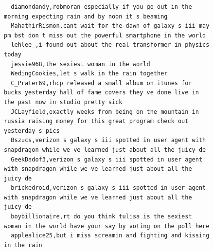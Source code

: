 \begin{figure}[htpb]
\begin{verbatim}
  diamondandy,robmoran especially if you go out in the morning expecting rain and by noon it s beaming
  MahathirRismon,cant wait for the dawn of galaxy s iii may pm bst don t miss out the powerful smartphone in the world
  lehlee_,i found out about the real transformer in physics today
  jessie968,the sexiest woman in the world
  WedingCookies,let s walk in the rain together
  C_Prater69,rhcp released a small album on itunes for bucks yesterday hall of fame covers they ve done live in the past now in studio pretty sick
  JCLayfield,exactly weeks from being on the mountain in russia raising money for this great program check out yesterday s pics
  Bszucs,verizon s galaxy s iii spotted in user agent with snapdragon while we ve learned just about all the juicy de
  GeekDadof3,verizon s galaxy s iii spotted in user agent with snapdragon while we ve learned just about all the juicy de
  brickedroid,verizon s galaxy s iii spotted in user agent with snapdragon while we ve learned just about all the juicy de
  boybillionaire,rt do you think tulisa is the sexiest woman in the world have your say by voting on the poll here
  applealice25,but i miss screamin and fighting and kissing in the rain


\end{verbatim}
\end{figure}
